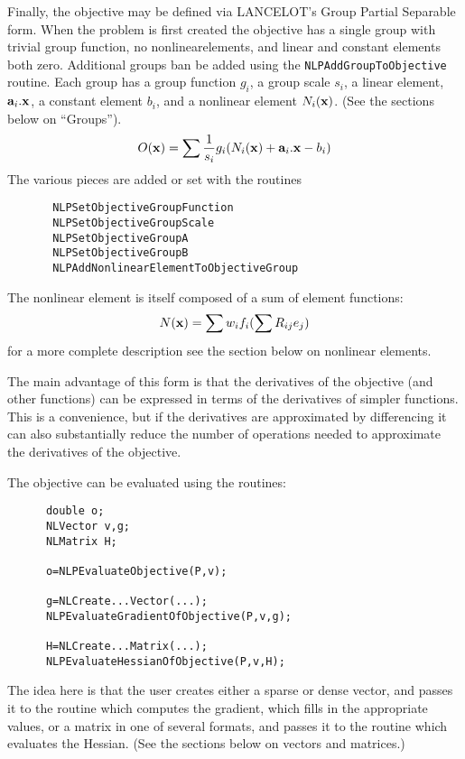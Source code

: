 \documentclass[12pt]{article}
\begin{document}
     Finally, the objective may be defined via LANCELOT's Group Partial Separable form. When the problem is 
     first created the objective has a single group with trivial group function, no nonlinearelements, and
     linear and constant elements both zero. Additional groups ban be added using the
     {\tt NLPAdd\-Group\-To\-Objective} routine. Each group has a group function $g_i$, a group scale $s_i$,
     a linear element, ${\bf a}_i.{\bf x}$, a constant element $b_i$, and a nonlinear element $N_i({\bf x})$.
     (See the sections below on ``Groups''). 
     \begin{displaymath}
       O({\bf x}) = \sum {1\over{s_i}}g_i(N_i({\bf x})+ {\bf a}_i.{\bf x}-b_i)
     \end{displaymath}
     The various pieces are added or set with the routines
     \begin{verbatim}
       NLPSetObjectiveGroupFunction
       NLPSetObjectiveGroupScale
       NLPSetObjectiveGroupA
       NLPSetObjectiveGroupB
       NLPAddNonlinearElementToObjectiveGroup
     \end{verbatim}
     The nonlinear element is itself composed of a sum of element functions:
     \begin{displaymath}
       N({\bf x}) = \sum w_i f_i( \sum R_{ij} e_j )
     \end{displaymath}
     for a more complete description see the section below on nonlinear elements.

     The main advantage of this form is that the derivatives of the objective (and other functions) can be
     expressed in terms of the derivatives of simpler functions. This is a convenience, but if the derivatives
     are approximated by differencing it can also substantially reduce the number of operations needed to approximate
     the derivatives of the objective.

     The objective can be evaluated using the routines:
     \begin{verbatim}
      double o;
      NLVector v,g;
      NLMatrix H;

      o=NLPEvaluateObjective(P,v);

      g=NLCreate...Vector(...);
      NLPEvaluateGradientOfObjective(P,v,g);

      H=NLCreate...Matrix(...);
      NLPEvaluateHessianOfObjective(P,v,H);
     \end{verbatim}
     The idea here is that the user creates either a sparse or dense vector, and passes it to the routine
     which computes the gradient, which fills in the appropriate values, or a matrix in one of several 
     formats, and passes it to the routine which evaluates the Hessian. (See the sections below on vectors
     and matrices.)
\end{document}

